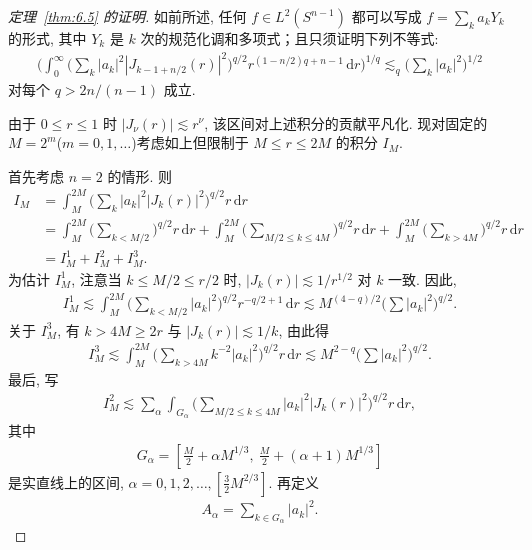 \begin{proof}[定理~\ref{thm:6.5} 的证明]
如前所述, 任何 $f \in L^2(S^{n-1})$ 都可以写成 $f = \sum_k a_k Y_k$ 的形式, 其中 $Y_k$ 是 $k$ 次的规范化调和多项式；且只须证明下列不等式:
\begin{align*}
  \Big(\int_{0}^{\infty}\Big(\sum_{k}|a_{k}|^{2}|J_{k-1+n/2}(r)|^{2}\Big)^{q/2}
  r^{(1-n/2)q+n-1}\,\mathrm{d}r\Big)^{1/q}
  \lesssim_{q}\Big(\sum_{k}|a_{k}|^{2}\Big)^{1/2}
\end{align*}
对每个 $q > 2n/(n - 1)$ 成立.

由于 $0 \leq r \leq 1$ 时 $|J_{\nu}(r)| \lesssim r^{\nu}$, 该区间对上述积分的贡献平凡化. 现对固定的 $M = 2^m$($m = 0,1,\ldots$)考虑如上但限制于 $M \leq r \leq 2M$ 的积分 $I_M$.

首先考虑 $n = 2$ 的情形. 则
\begin{align*}
  I_{M}&=\int_{M}^{2M}\Big(\sum_{k}|a_{k}|^{2}\left|J_{k}(r)\right|^{2}\Big)^{q/2}r\,\mathrm{d}r\\
  &=\int_{M}^{2M}\Big(\sum_{k<M/2}\Big)^{q/2}r\,\mathrm{d}r
   +\int_{M}^{2M}\Big(\sum_{M/2\leq k\leq 4M}\Big)^{q/2}r\,\mathrm{d}r
   +\int_{M}^{2M}\Big(\sum_{k>4M}\Big)^{q/2}r\,\mathrm{d}r\\
  &=I_{M}^{1}+I_{M}^{2}+I_{M}^{3}.
\end{align*}
为估计 $I_M^1$, 注意当 $k \leq M/2 \leq r/2$ 时, $|J_k(r)| \lesssim 1/r^{1/2}$ 对 $k$ 一致. 因此,
\begin{align*}
  I_{M}^{1}\lesssim\int_{M}^{2M}\Big(\sum_{k<M/2}|a_{k}|^{2}\Big)^{q/2}r^{-q/2+1}\,\mathrm{d}r
  \lesssim M^{(4-q)/2}\Big(\sum|a_{k}|^{2}\Big)^{q/2}.
\end{align*}
关于 $I_M^3$, 有 $k > 4M \geq 2r$ 与 $|J_k(r)| \lesssim 1/k$, 由此得
\begin{align*}
  I_{M}^{3}\lesssim\int_{M}^{2M}\Big(\sum_{k>4M}k^{-2}|a_{k}|^{2}\Big)^{q/2}r\,\mathrm{d}r
  \lesssim M^{2-q}\Big(\sum|a_{k}|^{2}\Big)^{q/2}.
\end{align*}
最后, 写
\begin{align*}
  I_{M}^{2}\lesssim\sum_{\alpha}\int_{G_{\alpha}}\Big(\sum_{M/2\leq k\leq 4M}|a_{k}|^{2}|J_{k}(r)|^{2}\Big)^{q/2}r\,\mathrm{d}r,
\end{align*}
其中
\begin{align*}
  G_{\alpha}=\left[\frac{M}{2}+\alpha M^{1/3},\ \frac{M}{2}+(\alpha+1)M^{1/3}\right]
\end{align*}
是实直线上的区间, $\alpha = 0, 1, 2, \ldots, \left[\frac{3}{2}M^{2/3}\right]$. 再定义
\begin{align*}
  A_{\alpha}=\sum_{k\in G_{\alpha}}|a_{k}|^{2}.

\end{align*}
\end{proof}
